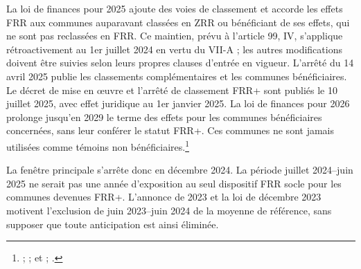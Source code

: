 La loi de finances pour 2025 ajoute des voies de classement et accorde les effets FRR aux communes auparavant classées en ZRR ou bénéficiant de ses effets, qui ne sont pas reclassées en FRR. Ce maintien, prévu à l’article 99, IV, s’applique rétroactivement au 1er juillet 2024 en vertu du VII-A ; les autres modifications doivent être suivies selon leurs propres clauses d’entrée en vigueur. L’arrêté du 14 avril 2025 publie les classements complémentaires et les communes bénéficiaires. Le décret de mise en œuvre et l’arrêté de classement FRR+ sont publiés le 10 juillet 2025, avec effet juridique au 1er janvier 2025. La loi de finances pour 2026 prolonge jusqu’en 2029 le terme des effets pour les communes bénéficiaires concernées, sans leur conférer le statut FRR+. Ces communes ne sont jamais utilisées comme témoins non bénéficiaires.\footnote{ ;  ;  et  ; .}

La fenêtre principale s’arrête donc en décembre 2024. La période juillet 2024–juin 2025 ne serait pas une année d’exposition au seul dispositif FRR socle pour les communes devenues FRR+. L’annonce de 2023 et la loi de décembre 2023 motivent l’exclusion de juin 2023–juin 2024 de la moyenne de référence, sans supposer que toute anticipation est ainsi éliminée.

